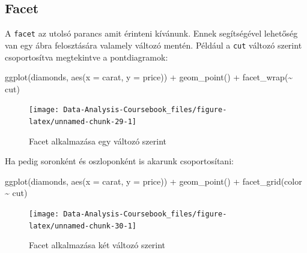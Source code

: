 \documentclass[
]{article}
\newenvironment{Shaded}{\begin{snugshade}}{\end{snugshade}}
\newcommand{\AttributeTok}[1]{\textcolor[rgb]{0.77,0.63,0.00}{#1}}
\newcommand{\FunctionTok}[1]{\textcolor[rgb]{0.00,0.00,0.00}{#1}}
\newcommand{\NormalTok}[1]{#1}
\newcommand{\SpecialCharTok}[1]{\textcolor[rgb]{0.00,0.00,0.00}{#1}}
\begin{document}
\hypertarget{facet}{%
\subsection{Facet}\label{facet}}

A \texttt{facet} az utolsó parancs amit érinteni kívánunk. Ennek segítségével lehetőség van egy ábra felosztására valamely változó mentén. Például a \texttt{cut} változó szerint csoportosítva megtekintve a pontdiagramok:

\begin{Shaded}
\begin{Highlighting}[]
\FunctionTok{ggplot}\NormalTok{(diamonds, }\FunctionTok{aes}\NormalTok{(}\AttributeTok{x =}\NormalTok{ carat, }\AttributeTok{y =}\NormalTok{ price)) }\SpecialCharTok{+}
  \FunctionTok{geom\_point}\NormalTok{() }\SpecialCharTok{+}
  \FunctionTok{facet\_wrap}\NormalTok{(}\SpecialCharTok{\textasciitilde{}}\NormalTok{ cut)}
\end{Highlighting}
\end{Shaded}

\begin{figure}

{\centering \texttt{[image: Data-Analysis-Coursebook\_files/figure-latex/unnamed-chunk-29-1]} 

}

\caption{Facet alkalmazása egy változó szerint}\label{fig:unnamed-chunk-29}
\end{figure}

Ha pedig soronként és oszloponként is akarunk csoportosítani:

\begin{Shaded}
\begin{Highlighting}[]
\FunctionTok{ggplot}\NormalTok{(diamonds, }\FunctionTok{aes}\NormalTok{(}\AttributeTok{x =}\NormalTok{ carat, }\AttributeTok{y =}\NormalTok{ price)) }\SpecialCharTok{+}
  \FunctionTok{geom\_point}\NormalTok{() }\SpecialCharTok{+}
  \FunctionTok{facet\_grid}\NormalTok{(color }\SpecialCharTok{\textasciitilde{}}\NormalTok{ cut)}
\end{Highlighting}
\end{Shaded}

\begin{figure}

{\centering \texttt{[image: Data-Analysis-Coursebook\_files/figure-latex/unnamed-chunk-30-1]} 

}

\caption{Facet alkalmazása két változó szerint}\label{fig:unnamed-chunk-30}
\end{figure}
\end{document}
